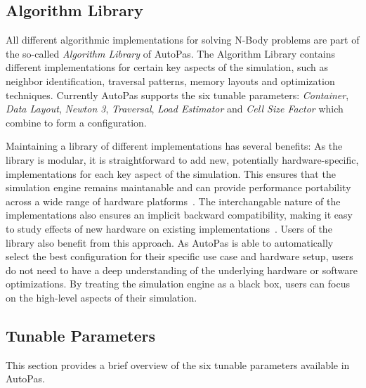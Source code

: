 \documentclass[conference]{IEEEtran}
\begin{document}
\subsection{Algorithm Library}

All different algorithmic implementations for solving N-Body problems are part of the so-called \textit{Algorithm Library} of AutoPas. The Algorithm Library contains different implementations for certain key aspects of the simulation, such as neighbor identification, traversal patterns, memory layouts and optimization techniques. Currently AutoPas supports the six tunable parameters: \textit{Container}, \textit{Data Layout}, \textit{Newton 3}, \textit{Traversal}, \textit{Load Estimator} and \textit{Cell Size Factor} which combine to form a configuration.

Maintaining a library of different implementations has several benefits: As the library is modular, it is straightforward to add new, potentially hardware-specific, implementations for each key aspect of the simulation. This ensures that the simulation engine remains maintanable and can provide performance portability across a wide range of hardware platforms~\cite{Tchipev2020}. The interchangable nature of the implementations also ensures an implicit backward compatibility, making it easy to study effects of new hardware on existing implementations~\cite{Tchipev2020}. Users of the library also benefit from this approach. As AutoPas is able to automatically select the best configuration for their specific use case and hardware setup, users do not need to have a deep understanding of the underlying hardware or software optimizations. By  treating the simulation engine as a black box, users can focus on the high-level aspects of their simulation.

\subsection{Tunable Parameters}

This section provides a brief overview of the six tunable parameters available in AutoPas.
\end{document}
